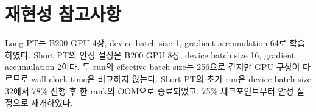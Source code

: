 \section{재현성 참고사항}

Long PT는 B200 GPU 4장, device batch size 1, gradient accumulation
64로 학습하였다. Short PT의 안정 설정은 B200 GPU 8장, device batch
size 16, gradient accumulation 2이다. 두 run의 effective batch
size는 256으로 같지만 GPU 구성이 다르므로 wall-clock time은
비교하지 않는다. Short PT의 초기 run은 device batch size 32에서
78\% 진행 후 한 rank의 OOM으로 종료되었고, 75\% 체크포인트부터 안정
설정으로 재개하였다.
